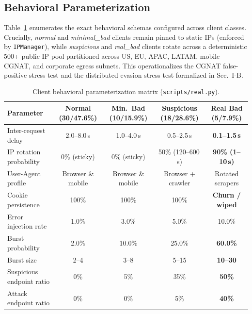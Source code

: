 \documentclass[journal,10pt]{IEEEtran}
\begin{document}
\subsection{Behavioral Parameterization}
Table~\ref{tab:behaviors} enumerates the exact behavioral schemas configured across client classes. Crucially, \emph{normal} and \emph{minimal\_bad} clients remain pinned to static IPs (enforced by \texttt{IPManager}), while \emph{suspicious} and \emph{real\_bad} clients rotate across a deterministic 500+ public IP pool partitioned across US, EU, APAC, LATAM, mobile CGNAT, and corporate egress subnets. This operationalizes the CGNAT false-positive stress test and the distributed evasion stress test formalized in Sec.~I-B.

\begin{table}[!t]
\centering
\caption{Client behavioral parameterization matrix (\texttt{scripts/real.py}).}
\label{tab:behaviors}
\renewcommand{\arraystretch}{1.15}
\begin{tabular}{@{}lcccc@{}}
\toprule
\textbf{Parameter} & \textbf{Normal} (30/47.6\%) & \textbf{Min.\ Bad} (10/15.9\%) & \textbf{Suspicious} (18/28.6\%) & \textbf{Real Bad} (5/7.9\%)\\
\midrule
Inter-request delay               & 2.0--8.0\,s            & 1.0--4.0\,s            & 0.5--2.5\,s            & \textbf{0.1--1.5\,s}\\
IP rotation probability           & 0\% (sticky)           & 0\% (sticky)           & 50\% (120--600\,s)     & \textbf{90\% (1--10\,s)}\\
User-Agent profile                & Browser \& mobile      & Browser \& mobile      & Browser + crawler      & Rotated scrapers\\
Cookie persistence                & 100\%                 & 100\%                  & 100\%                  & \textbf{Churn / wiped}\\
Error injection rate              & 1.0\%                 & 3.0\%                  & 5.0\%                  & 10.0\%\\
Burst probability                 & 2.0\%                 & 10.0\%                 & 25.0\%                 & \textbf{60.0\%}\\
Burst size                        & 2--4                  & 3--8                   & 5--15                  & \textbf{10--30}\\
Suspicious endpoint ratio         & 0\%                   & 5\%                    & 35\%                   & \textbf{50\%}\\
Attack endpoint ratio             & 0\%                   & 0\%                    & 5\%                    & \textbf{40\%}\\
\bottomrule
\end{tabular}
\end{table}
\end{document}
